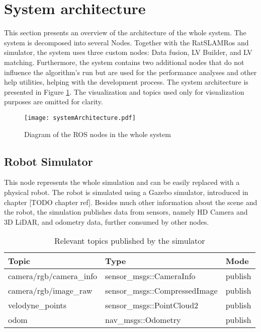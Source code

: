 \section{System architecture}

This section presents an overview of the architecture of the whole system. The system is decomposed into several Nodes. Together with the  RatSLAMRos and simulator, the system uses three custom nodes: Data fusion, LV Builder, and LV matching. Furthermore, the system contains two additional nodes that do not influence the algorithm's run but are used for the performance analyses and other help utilities, helping with the development process. The system architecture is presented in Figure \ref{fig:systemArchitecture}. The visualization and topics used only for visualization purposes are omitted for clarity.

\begin{figure}[htpb]
    \centering
    \texttt{[image: systemArchitecture.pdf]}
    \caption{Diagram of the ROS nodes in the whole system} \label{fig:systemArchitecture}
\end{figure}

\subsection{Robot Simulator}

This node represents the whole simulation and can be easily replaced with a physical robot. The robot is simulated using a Gazebo simulator, introduced in chapter [TODO chapter ref]. Besides much other information about the scene and the robot, the simulation publishes data from sensors, namely HD Camera and 3D LiDAR, and odometry data, further consumed by other nodes.

\begin{table}[htpb]
    \caption{Relevant topics published by the simulator}\label{tab:robotSimulatorTopics}
    \centering
    \begin{tabular}{l l l}
        \toprule
        Topic                   & Type                          & Mode    \\
        \midrule
        camera/rgb/camera\_info & sensor\_msgs::CameraInfo      & publish \\
        camera/rgb/image\_raw   & sensor\_msgs::CompressedImage & publish \\
        velodyne\_points        & sensor\_msgs::PointCloud2     & publish \\
        odom                    & nav\_msgs::Odometry           & publish \\
        \bottomrule
    \end{tabular}
\end{table}


